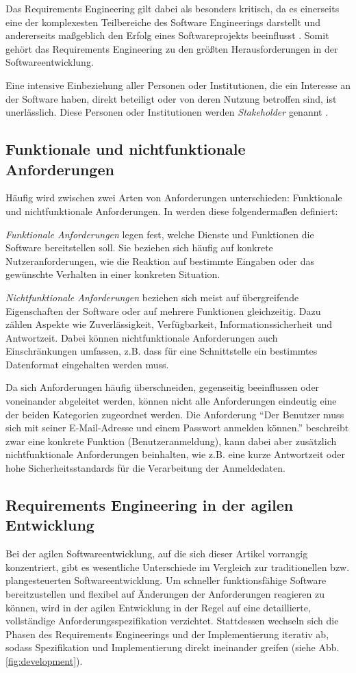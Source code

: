 \documentclass[acmtog]{acmart}
\begin{document}
Das Requirements Engineering gilt dabei als besonders kritisch, da es einerseits eine der komplexesten Teilbereiche des Software Engineerings darstellt und andererseits maßgeblich den Erfolg eines Softwareprojekts beeinflusst \cite{balzert09}.
Somit gehört das Requirements Engineering zu den größten Herausforderungen in der Softwareentwicklung.

Eine intensive Einbeziehung aller Personen oder Institutionen, die ein Interesse an der Software haben, direkt beteiligt oder von deren Nutzung betroffen sind, ist unerlässlich. Diese Personen oder Institutionen werden \emph{Stakeholder} genannt \cite{balzert09}.

\subsection{Funktionale und nichtfunktionale Anforderungen}
Häufig wird zwischen zwei Arten von Anforderungen unterschieden: Funktionale und nichtfunktionale Anforderungen. In \cite{sommerville16} werden diese folgendermaßen definiert:

\emph{Funktionale Anforderungen} legen fest, welche Dienste und Funktionen die Software bereitstellen soll. Sie beziehen sich häufig auf konkrete Nutzeranforderungen, wie die Reaktion auf bestimmte Eingaben oder das gewünschte Verhalten in einer konkreten Situation.

\emph{Nichtfunktionale Anforderungen} beziehen sich meist auf übergreifende Eigenschaften der Software oder auf mehrere Funktionen gleichzeitig. Dazu zählen Aspekte wie Zuverlässigkeit, Verfügbarkeit, Informationssicherheit und Antwortzeit. Dabei können nichtfunktionale Anforderungen auch Einschränkungen umfassen, z.B. dass für eine Schnittstelle ein bestimmtes Datenformat eingehalten werden muss.

Da sich Anforderungen häufig überschneiden, gegenseitig beeinflussen oder voneinander abgeleitet werden, können nicht alle Anforderungen eindeutig eine der beiden Kategorien zugeordnet werden. Die Anforderung ``Der Benutzer muss sich mit seiner E-Mail-Adresse und einem Passwort anmelden können.'' beschreibt zwar eine konkrete Funktion (Benutzeranmeldung), kann dabei aber zusätzlich nichtfunktionale Anforderungen beinhalten, wie z.B. eine kurze Antwortzeit oder hohe Sicherheitsstandards für die Verarbeitung der Anmeldedaten.

\subsection{Requirements Engineering in der agilen Entwicklung}
Bei der agilen Softwareentwicklung, auf die sich dieser Artikel vorrangig konzentriert, gibt es wesentliche Unterschiede im Vergleich zur traditionellen bzw. plangesteuerten Softwareentwicklung.
Um schneller funktionsfähige Software bereitzustellen und flexibel auf Änderungen der Anforderungen reagieren zu können, wird in der agilen Entwicklung in der Regel auf eine detaillierte, vollständige  Anforderungsspezifikation verzichtet.
Stattdessen wechseln sich die Phasen des Requirements Engineerings und der Implementierung iterativ ab, sodass Spezifikation und Implementierung direkt ineinander greifen (siehe Abb. \ref{fig:development}).
\end{document}
